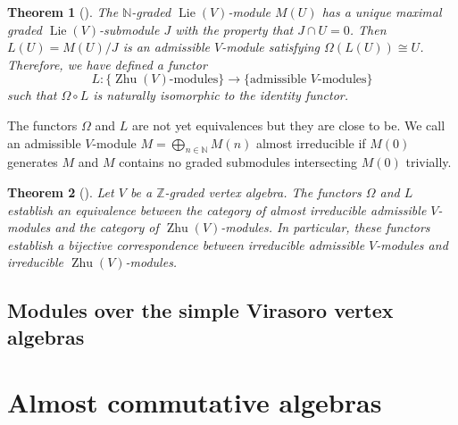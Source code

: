 \documentclass[a4paper, 12pt, reqno]{amsart}
\newtheorem{theorem}{Theorem}[subsection]
\theoremstyle{remark}
\numberwithin{equation}{subsection}
\DeclareMathOperator{\Lie}{Lie}
\DeclareMathOperator{\Zhu}{Zhu}
\begin{document}
\begin{theorem}[{\cite[\S 2]{de_sole_finite_2006}}]
  \label{thr:38}
  The $\mathbb{N}$-graded $\Lie(V)$-module $M(U)$ has a unique maximal graded $\Lie(V)$-submodule $J$ with the property that $J \cap U = 0$.
  Then $L(U) = M(U)/J$ is an admissible $V$-module satisfying $\Omega(L(U)) \cong U$.
  Therefore, we have defined a functor
  \begin{equation*}
  L: \{\text{$\Zhu(V)$-modules}\} \to \{\text{admissible $V$-modules}\}
  \end{equation*}
  such that $\Omega \circ L$ is naturally isomorphic to the identity functor.
\end{theorem}

The functors $\Omega$ and $L$ are not yet equivalences but they are close to be.
We call an admissible $V$-module $M = \bigoplus_{n \in \mathbb{N}}M(n)$ almost irreducible if $M(0)$ generates $M$ and $M$ contains no graded submodules intersecting $M(0)$ trivially.

\begin{theorem}[{\cite[\S 2]{de_sole_finite_2006}}]
  \label{thr:39}
  Let $V$ be a $\mathbb{Z}$-graded vertex algebra.
  The functors $\Omega$ and $L$ establish an equivalence between the category of almost irreducible admissible $V$-modules and the category of $\Zhu(V)$-modules.
  In particular, these functors establish a bijective correspondence between irreducible admissible $V$-modules and irreducible $\Zhu(V)$-modules.
\end{theorem}

\subsection{Modules over the simple Virasoro vertex algebras}
\label{sec:modules-over-simple}

\appendix
\section{Almost commutative algebras}
\label{sec:almost-comm-algebr}
\end{document}

